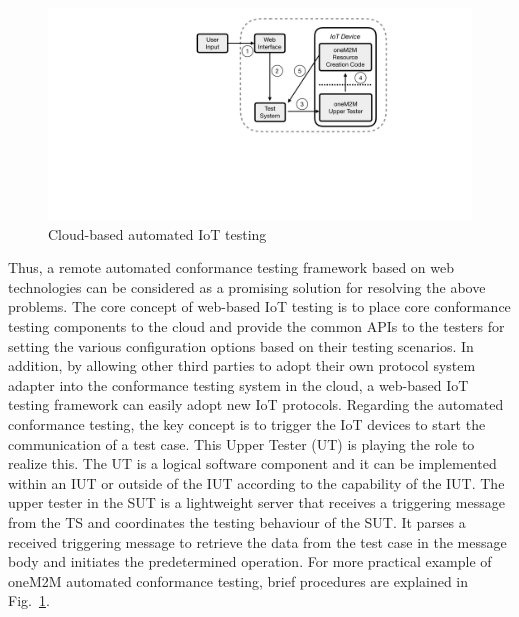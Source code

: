 \begin{figure}[H]			%
	\centering
	\includegraphics[width=\textwidth]{figures/fig_onem2m-automated-testing-procedure.pdf}
    \caption{Cloud-based automated IoT testing}
    \label{fig:cloud_based_automated_iot_testing}
\end{figure}

Thus, a remote automated conformance testing framework based on web technologies can be considered as a promising solution for resolving the above problems. The core concept of web-based IoT testing is to place core conformance testing components to the cloud and provide the common APIs to the testers for setting the various configuration options based on their testing scenarios. In addition, by allowing other third parties to adopt their own protocol system adapter into the conformance testing system in the cloud, a web-based IoT testing framework can easily adopt new IoT protocols. Regarding the automated conformance testing, the key concept is to trigger the IoT devices to start the communication of a test case. This Upper Tester (UT) is playing the role to realize this. The UT is a logical software component and it can be implemented within an IUT or outside of the IUT according to the capability of the IUT. The upper tester in the SUT is a lightweight server that receives a triggering message from the TS and coordinates the testing behaviour of the SUT. It parses a received triggering message to retrieve the data from the test case in the message body and initiates the predetermined operation. For more practical example of oneM2M automated conformance testing, brief procedures are explained in Fig.~\ref{fig:cloud_based_automated_iot_testing}.


